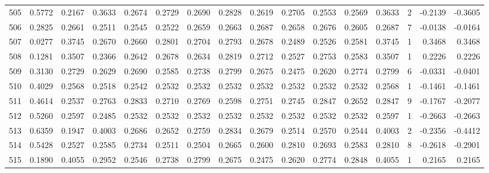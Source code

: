 \begin{tabular}{lrrrrrrrrrrrrrrr}
505 &      0.5772 &  0.2167 &  0.3633 &  0.2674 &  0.2729 &  0.2690 &  0.2828 &  0.2619 &  0.2705 &  0.2553 &   0.2569 &     0.3633 &      2 &                   -0.2139 &                    -0.3605 \\
506 &      0.2825 &  0.2661 &  0.2511 &  0.2545 &  0.2522 &  0.2659 &  0.2663 &  0.2687 &  0.2658 &  0.2676 &   0.2605 &     0.2687 &      7 &                   -0.0138 &                    -0.0164 \\
507 &      0.0277 &  0.3745 &  0.2670 &  0.2660 &  0.2801 &  0.2704 &  0.2793 &  0.2678 &  0.2489 &  0.2526 &   0.2581 &     0.3745 &      1 &                    0.3468 &                     0.3468 \\
508 &      0.1281 &  0.3507 &  0.2366 &  0.2642 &  0.2678 &  0.2634 &  0.2819 &  0.2712 &  0.2527 &  0.2753 &   0.2583 &     0.3507 &      1 &                    0.2226 &                     0.2226 \\
509 &      0.3130 &  0.2729 &  0.2629 &  0.2690 &  0.2585 &  0.2738 &  0.2799 &  0.2675 &  0.2475 &  0.2620 &   0.2774 &     0.2799 &      6 &                   -0.0331 &                    -0.0401 \\
510 &      0.4029 &  0.2568 &  0.2518 &  0.2542 &  0.2532 &  0.2532 &  0.2532 &  0.2532 &  0.2532 &  0.2532 &   0.2532 &     0.2568 &      1 &                   -0.1461 &                    -0.1461 \\
511 &      0.4614 &  0.2537 &  0.2763 &  0.2833 &  0.2710 &  0.2769 &  0.2598 &  0.2751 &  0.2745 &  0.2847 &   0.2652 &     0.2847 &      9 &                   -0.1767 &                    -0.2077 \\
512 &      0.5260 &  0.2597 &  0.2485 &  0.2532 &  0.2532 &  0.2532 &  0.2532 &  0.2532 &  0.2532 &  0.2532 &   0.2532 &     0.2597 &      1 &                   -0.2663 &                    -0.2663 \\
513 &      0.6359 &  0.1947 &  0.4003 &  0.2686 &  0.2652 &  0.2759 &  0.2834 &  0.2679 &  0.2514 &  0.2570 &   0.2544 &     0.4003 &      2 &                   -0.2356 &                    -0.4412 \\
514 &      0.5428 &  0.2527 &  0.2585 &  0.2734 &  0.2511 &  0.2504 &  0.2665 &  0.2600 &  0.2810 &  0.2693 &   0.2583 &     0.2810 &      8 &                   -0.2618 &                    -0.2901 \\
515 &      0.1890 &  0.4055 &  0.2952 &  0.2546 &  0.2738 &  0.2799 &  0.2675 &  0.2475 &  0.2620 &  0.2774 &   0.2848 &     0.4055 &      1 &                    0.2165 &                     0.2165 \\

\end{tabular}
